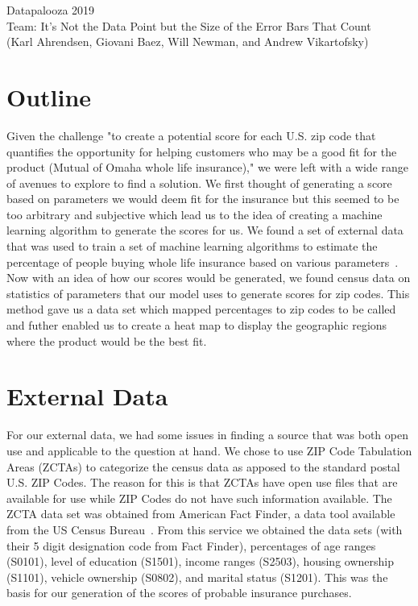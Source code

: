 \documentclass[12pt]{article}
\begin{document}
\begin{center}
Datapalooza 2019\\
\vspace{0.15cm}
Team: It's Not the Data Point but the Size of the Error Bars That Count\\
\vspace{0.15cm}
(Karl Ahrendsen, Giovani Baez, Will Newman, and Andrew Vikartofsky)
\end{center}

\section{Outline}
Given the challenge "to create a potential score for each U.S. zip code that quantifies the opportunity for helping customers who may be a good fit for the product (Mutual of Omaha whole life insurance)," we were left with a wide range of avenues to explore to find a solution.  
We first thought of generating a score based on parameters we would deem fit for the insurance but this seemed to be too arbitrary and subjective which lead us to the idea of creating a machine learning algorithm to generate the scores for us. 
We found a set of external data that was used to train a set of machine learning algorithms to estimate the percentage of people buying whole life insurance based on various parameters~\cite{COIL}. 
Now with an idea of how our scores would be generated, we found census data on statistics of parameters that our model uses to generate scores for zip codes. 
This method gave us a data set which mapped percentages to zip codes to be called and futher enabled us to create a heat map to display the geographic regions where the product would be the best fit. 

\section{External Data}
For our external data, we had some issues in finding a source that was both open use and applicable to the question at hand.
We chose to use ZIP Code Tabulation Areas (ZCTAs) to categorize the census data as apposed to the standard postal U.S. ZIP Codes. 
The reason for this is that ZCTAs have open use files that are available for use while ZIP Codes do not have such information available. 
The ZCTA data set was obtained from American Fact Finder, a data tool available from the US Census Bureau~\cite{Census}. 
From this service we obtained the data sets (with their 5 digit designation code from Fact Finder), percentages of age ranges (S0101), level of education (S1501), income ranges (S2503), housing ownership (S1101), vehicle ownership (S0802), and marital status (S1201). 
This was the basis for our generation of the scores of probable insurance purchases.
\end{document}
